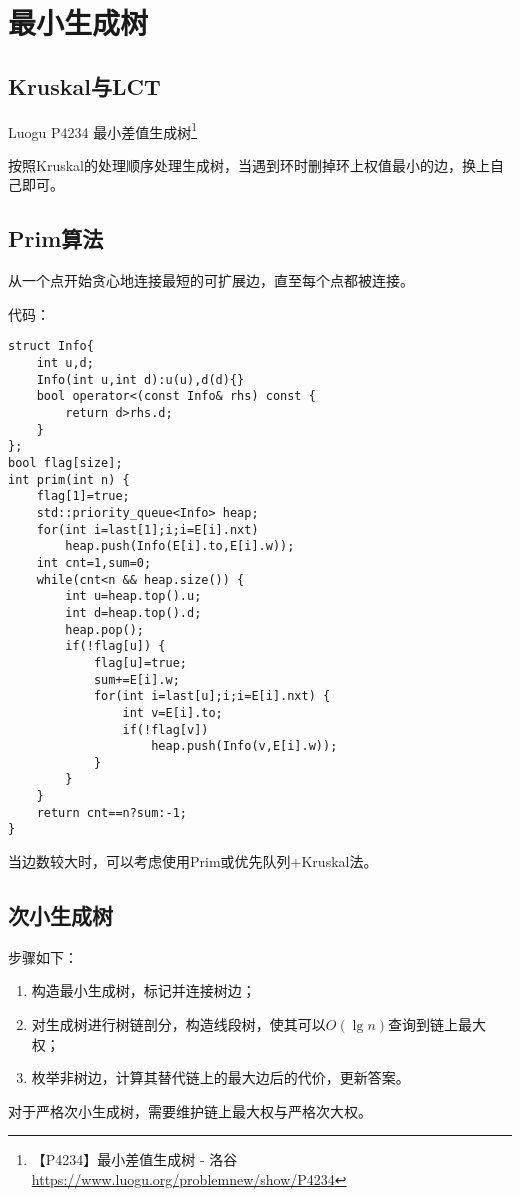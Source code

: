 \section{最小生成树}
\subsection{Kruskal与LCT}
Luogu P4234 最小差值生成树\footnote{【P4234】最小差值生成树 - 洛谷
	\url{https://www.luogu.org/problemnew/show/P4234}
}

按照Kruskal的处理顺序处理生成树，当遇到环时删掉环上权值最小的边，换上自己即可。

\subsection{Prim算法}

从一个点开始贪心地连接最短的可扩展边，直至每个点都被连接。

代码：
\begin{lstlisting}
struct Info{
    int u,d;
    Info(int u,int d):u(u),d(d){}
    bool operator<(const Info& rhs) const {
        return d>rhs.d;
    }
};
bool flag[size];
int prim(int n) {
    flag[1]=true;
    std::priority_queue<Info> heap;
    for(int i=last[1];i;i=E[i].nxt)
        heap.push(Info(E[i].to,E[i].w));
    int cnt=1,sum=0;
    while(cnt<n && heap.size()) {
        int u=heap.top().u;
        int d=heap.top().d;
        heap.pop();
        if(!flag[u]) {
            flag[u]=true;
            sum+=E[i].w;
            for(int i=last[u];i;i=E[i].nxt) {
                int v=E[i].to;
                if(!flag[v])
                    heap.push(Info(v,E[i].w));
            }
        }
    }
    return cnt==n?sum:-1;
}
\end{lstlisting}

当边数较大时，可以考虑使用Prim或优先队列+Kruskal法。

\subsection{次小生成树}
步骤如下：
\begin{enumerate}
	\item 构造最小生成树，标记并连接树边；
	\item 对生成树进行树链剖分，构造线段树，使其可以$O(\lg n)$查询到链上最大权；
	\item 枚举非树边，计算其替代链上的最大边后的代价，更新答案。
\end{enumerate}

对于严格次小生成树，需要维护链上最大权与严格次大权。

